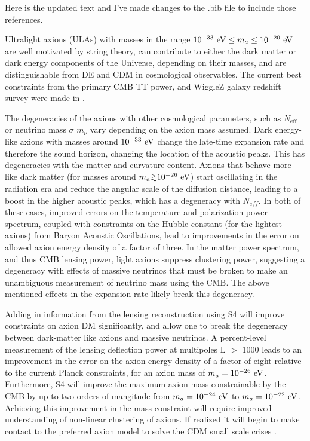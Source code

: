 Here is the updated text and I've made changes to the .bib file to include those references.

Ultralight axions (ULAs) with masses in the range $10^{-33}~{\rm eV}\leq m_{a}\leq 10^{-20}~{\rm eV}$ are well motivated by string theory, can contribute to either the dark matter or dark energy components of the Universe, depending on their masses, and are distinguishable from DE and CDM in cosmological observables. The current best constraints from the primary CMB TT power, and WiggleZ galaxy redshift survey were made in \cite{hlozek:2015axa}.

The degeneracies of the axions with other cosmological parameters, such as $N_\mathrm{eff}$ or neutrino mass $\sigma$ $m_\nu$ vary depending on the axion mass assumed. Dark energy-like axions with masses around $10^{-33}~{\rm eV}$ change the late-time expansion rate and therefore the sound horizon, changing the location of the acoustic peaks. This has degeneracies with the matter and curvature content.
 Axions that behave more like dark matter (for masses around $m_a \gtrsim 10^{-26}~{\rm eV}$) start oscillating in the radiation era and reduce the angular scale of the diffusion distance, leading to a boost in the higher acoustic peaks, which has a degeneracy with $N_{eff}$.
 In both of these cases, improved errors on the temperature and polarization power spectrum, coupled with constraints on the Hubble constant (for the lightest axions) from Baryon Acoustic Oscillations, lead to improvements in the error on allowed axion energy density of a factor of three.
In the matter power spectrum, and thus CMB lensing power, light axions suppress clustering power, suggesting a degeneracy with effects of massive neutrinos that must be broken to make an unambiguous measurement of neutrino mass using the CMB. The above mentioned effects in the expansion rate likely break this degeneracy.
 
 Adding in information from the lensing reconstruction using S4 will improve constraints on axion DM significantly, and allow one to break the degeneracy between dark-matter like axions and massive neutrinos. A percent-level measurement of the lensing deflection power at multipoles L $>$ 1000 leads to an improvement in the error on the axion energy density of a factor of eight relative to the current Planck constraints, for an axion mass of $m_a=10^{-26}~{\rm eV}$. Furthermore, S4 will improve the maximum axion mass constrainable by the CMB by up to two orders of mangitude from $m_a=10^{-24}~{\rm eV}$ to $m_a=10^{-22}~{\rm eV}$. Achieving this improvement in the mass constraint will require improved understanding of non-linear clustering of axions. If realized it will begin to make contact to the preferred axion model to solve the CDM small scale crises \cite{hu:00a, marsh:2013js}.



%



